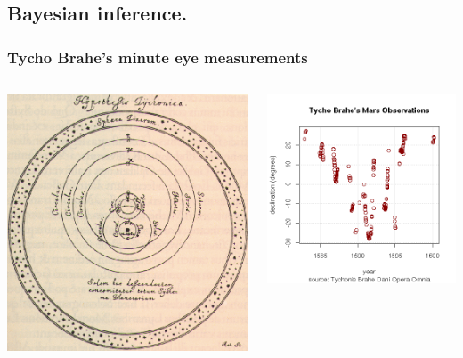 \documentclass{beamer}
\begin{document}
\subsection{Bayesian inference.}
\begin{frame}
  \frametitle{Tycho Brahe's minute eye measurements}
  \begin{columns}
    \begin{column}{0.5\textwidth}
      \includegraphics[width=\columnwidth]{figures/circular-orbits}
    \end{column}
    \begin{column}{0.5\textwidth}
      \includegraphics[width=\columnwidth]{figures/tycho-observations}

\end{column}
\end{columns}
\end{frame}
\end{document}

